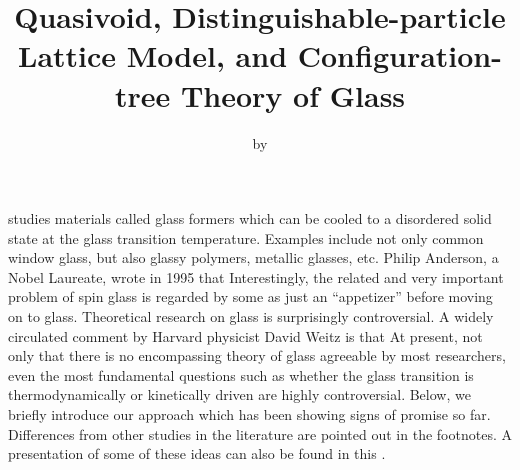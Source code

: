 \documentclass[aps,rmp,tighten,twocolumn,floatfix,a4paper,longbibliography]{revtex4-1}
\begin{document}
\newcommand{\srcfile}[1]{\src{\ssi{src/#1.html}}\srclink{#1}}
\newcommand{\srcfileboth}[1]{\src{\ssi{src/#1.py.html}}\srclink{#1.py} \src{\ssi{src/#1.cpp.html}}\srclink{#1.cpp}}
\newcommand{\datafile}[1]{\link{src/#1}{#1}}

\title{Quasivoid, Distinguishable-particle Lattice Model, and Configuration-tree Theory of Glass}
\author{by }
\maketitle


 studies materials called glass formers which can be cooled to a disordered solid state at the glass transition temperature. Examples include not only common window glass, but also glassy polymers, metallic glasses, etc. Philip Anderson, a Nobel Laureate, wrote in 1995 that 
Interestingly, the related and very important problem of spin glass is regarded by some as just an ``appetizer'' before moving on to glass. Theoretical research on glass is surprisingly controversial.
A widely circulated comment by Harvard physicist David Weitz is that  At present, not only that there is no encompassing theory of glass agreeable by most researchers, even the most fundamental questions such as whether the glass transition is thermodynamically or kinetically driven are highly controversial.
%
Below, we briefly introduce our approach which has been showing signs of promise so far.
Differences from other studies in the literature are pointed out in the footnotes.
A presentation of some of these ideas can also be found in this .

\end{document}
